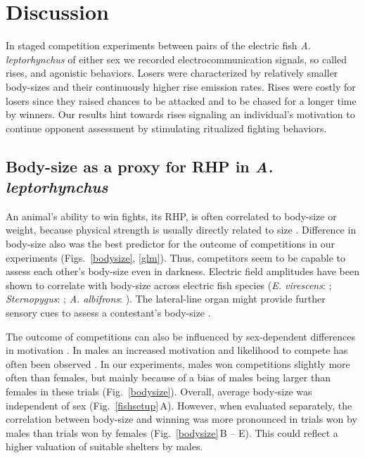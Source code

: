 \documentclass[vruler,JEB]{COB}%
\newcommand{\albi}{\textit{A. albifrons}}
\newcommand{\lepto}{\textit{A. leptorhynchus}}
\newcommand{\eig}{\textit{E. virescens}}
\newcommand{\sterno}{\textit{Sternopygus}}
\newcommand{\panel}[1]{\textsf{#1}}
\newcommand{\fref}[1]{\textup{\ref{#1}}}
\newcommand{\subfref}[2]{\textup{\ref{#1}}\,\panel{#2}}
\newcommand{\Figb}{Fig.}
\newcommand{\Figsb}{Figs.}
\newcommand{\Figrefb}[1]{\Figb~\fref{#1}}
\newcommand{\Figsrefb}[1]{\Figsb~\fref{#1}}
\newcommand{\Subfigrefb}[2]{\Figb~\subfref{#1}{#2}}
\begin{document}
\section{Discussion} %

In staged competition experiments between pairs of the electric fish \lepto{} of either sex we recorded electrocommunication signals, so called rises, and agonistic behaviors. Losers were characterized by relatively smaller body-sizes and their continuously higher rise emission rates. Rises were costly for losers since they raised chances to be attacked and to be chased for a longer time by winners. Our results hint towards rises signaling an individual's motivation to continue opponent assessment by stimulating ritualized fighting behaviors.

\subsection{Body-size as a proxy for RHP in \lepto{}}

An animal's ability to win fights, its RHP, is often correlated to body-size or weight, because physical strength is usually directly related to size \citep{Parker1974, Archer1988}. Difference in body-size also was the best predictor for the outcome of competitions in our experiments (\Figsrefb{bodysize}, \fref{glm}). Thus, competitors seem to be capable to assess each other's body-size even in darkness. Electric field amplitudes have been shown to correlate with body-size across electric fish species (\eig{}: \citealp{Westby1981}; \sterno{}: \citealp{Hopkins1972}; \albi{}: \citealp{Knudsen1975}). 
The lateral-line organ might provide further sensory cues to assess a contestant's body-size \citep{Butler2015}. 

The outcome of competitions can also be influenced by sex-dependent differences in motivation \citep{EnquistLeimar1987, ArnottElwood2008, Dunham2008}. In males an increased motivation and likelihood to compete has often been observed \citep{Archer1988}. In our experiments, males won competitions slightly more often than females, but mainly because of a bias of males being larger than females in these trials (\Figrefb{bodysize}). Overall, average body-size was independent of sex (\Subfigrefb{fishsetup}{A}). However, when evaluated separately, the correlation between body-size and winning was more pronounced in trials won by males than trials won by females (\Subfigrefb{bodysize}{B -- E}). This could reflect a higher valuation of suitable shelters by males. 
\end{document}
